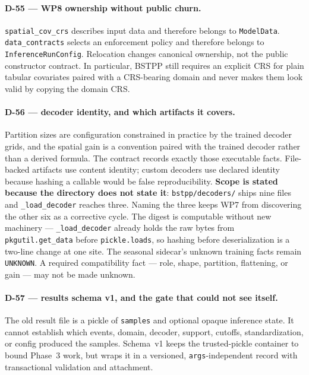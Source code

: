 \documentclass[
  10pt,
]{article}
\begin{document}
\paragraph{D-55 --- WP8 ownership without public churn.}

\texttt{spatial\_cov\_crs} describes input data and therefore belongs to
\texttt{ModelData}. \texttt{data\_contracts} selects an enforcement policy and
therefore belongs to \texttt{InferenceRunConfig}. Relocation changes canonical
ownership, not the public constructor contract. In particular, BSTPP still
requires an explicit CRS for plain tabular covariates paired with a CRS-bearing
domain and never makes them look valid by copying the domain CRS.

\paragraph{D-56 --- decoder identity, and which artifacts it covers.}

Partition sizes are configuration constrained in practice by the trained
decoder grids, and the spatial gain is a convention paired with the trained
decoder rather than a derived formula. The contract records exactly those
executable facts. File-backed artifacts use content identity; custom decoders
use declared identity because hashing a callable would be false
reproducibility. \textbf{Scope is stated because the directory does not state
it}: \texttt{bstpp/decoders/} ships nine files and \texttt{\_load\_decoder}
reaches three. Naming the three keeps WP7 from discovering the other six as a
corrective cycle. The digest is computable without new machinery ---
\texttt{\_load\_decoder} already holds the raw bytes from
\texttt{pkgutil.get\_data} before \texttt{pickle.loads}, so hashing before
deserialization is a two-line change at one site. The seasonal sidecar's
unknown training facts remain \texttt{UNKNOWN}. A required compatibility fact
--- role, shape, partition, flattening, or gain --- may not be made unknown.

\paragraph{D-57 --- results schema v1, and the gate that could not see itself.}

The old result file is a pickle of \texttt{samples} and optional opaque
inference state. It cannot establish which events, domain, decoder, support,
cutoffs, standardization, or config produced the samples. Schema~v1 keeps the
trusted-pickle container to bound Phase~3 work, but wraps it in a versioned,
\texttt{args}-independent record with transactional validation and attachment.
\end{document}
